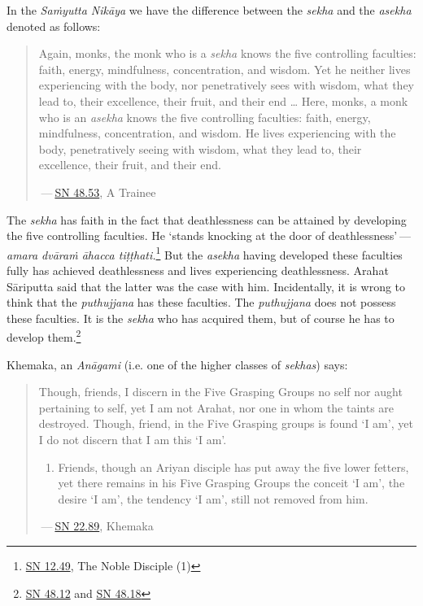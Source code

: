 In the \emph{Saṁyutta Nikāya} we have the difference between the \emph{sekha} and the \emph{asekha} denoted as follows:

\begin{quote}
Again, monks, the monk who is a \emph{sekha} knows the five controlling faculties: faith, energy, mindfulness, concentration, and wisdom. Yet he neither lives experiencing with the body, nor penetratively sees with wisdom, what they lead to, their excellence, their fruit, and their end \ldots\hspace{0pt} Here, monks, a monk who is an \emph{asekha} knows the five controlling faculties: faith, energy, mindfulness, concentration, and wisdom. He lives experiencing with the body, penetratively seeing with wisdom, what they lead to, their excellence, their fruit, and their end.

 --- \href{https://suttacentral.net/sn48.53/en/sujato}{SN 48.53}, A Trainee
\end{quote}

The \emph{sekha} has faith in the fact that deathlessness can be attained by developing the five controlling faculties. He `stands knocking at the door of deathlessness' --- \emph{amara dvāraṁ āhacca tiṭṭhati.}\footnote{\href{https://suttacentral.net/sn12.49/en/bodhi}{SN 12.49}, The Noble Disciple (1)} But the \emph{asekha} having developed these faculties fully has achieved deathlessness and lives experiencing deathlessness. Arahat Sāriputta said that the latter was the case with him. Incidentally, it is wrong to think that the \emph{puthujjana} has these faculties. The \emph{puthujjana} does not possess these faculties. It is the \emph{sekha} who has acquired them, but of course he has to develop them.\footnote{\href{https://suttacentral.net/sn48.12/en/sujato}{SN 48.12} and \href{https://suttacentral.net/sn48.18/en/sujato}{SN 48.18}}

Khemaka, an \emph{Anāgami} (i.e. one of the higher classes of \emph{sekhas}) says:

\begin{quote}
Though, friends, I discern in the Five Grasping Groups no self nor aught pertaining to self, yet I am not Arahat, nor one in whom the taints are destroyed. Though, friend, in the Five Grasping groups is found `I am', yet I do not discern that I am this `I am'.

\begin{enumerate}
\def\labelenumi{\roman{enumi}.}
\item
  Friends, though an Ariyan disciple has put away the five lower fetters, yet there remains in his Five Grasping Groups the conceit `I am', the desire `I am', the tendency `I am', still not removed from him.
\end{enumerate}

 --- \href{https://suttacentral.net/sn22.89/en/bodhi}{SN 22.89}, Khemaka
\end{quote}

